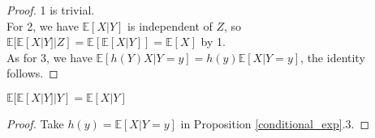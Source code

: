 \begin{proof}
    1 is trivial.\\
    For 2, we have $\mathbb E[X|Y]$ is independent of $Z$, so $\mathbb E[\mathbb E[X|Y]|Z]=\mathbb E[\mathbb E[X|Y]]=\mathbb E[X]$ by 1.\\
    As for 3, we have $\mathbb E[h(Y)X|Y=y]=h(y)\mathbb E[X|Y=y]$, the identity follows.
\end{proof}
\begin{corollary}
    $\mathbb E[\mathbb E[X|Y]|Y]=\mathbb E[X|Y]$
\end{corollary}
\begin{proof}
    Take $h(y)=\mathbb E[X|Y=y]$ in Proposition \ref{conditional_exp}.3.
\end{proof}